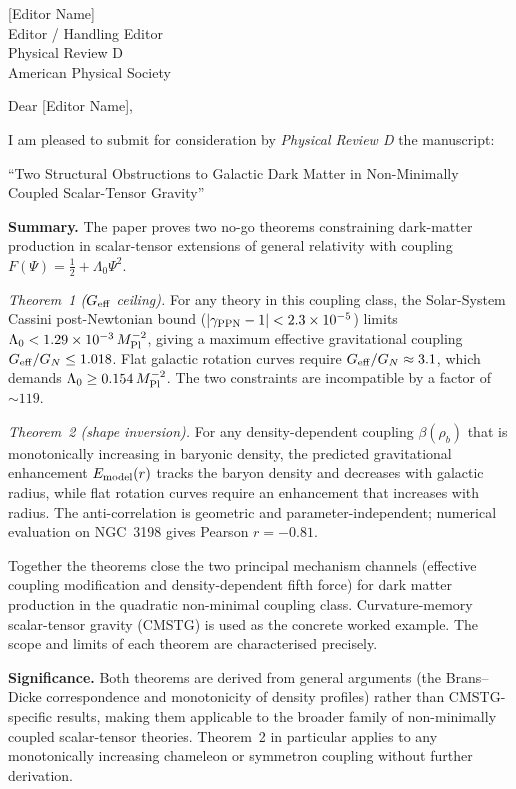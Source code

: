 \documentclass[12pt,a4paper]{letter}
\begin{document}
\begin{letter}{[Editor Name]\\
               Editor / Handling Editor\\
               Physical Review D\\
               American Physical Society}

\opening{Dear [Editor Name],}

I am pleased to submit for consideration by \textit{Physical Review D} the
manuscript:

\begin{center}
``Two Structural Obstructions to Galactic Dark Matter in Non-Minimally
Coupled Scalar-Tensor Gravity''
\end{center}

\textbf{Summary.}
The paper proves two no-go theorems constraining dark-matter production in
scalar-tensor extensions of general relativity with coupling $F(\Psi) =
\tfrac{1}{2} + \Lambda_0\Psi^2$.

\emph{Theorem~1 ($G_{\rm eff}$ ceiling).}
For any theory in this coupling class, the Solar-System Cassini
post-Newtonian bound ($|\gamma_{\rm PPN}-1| < 2.3\times10^{-5}$) limits
$\Lambda_0 < 1.29\times10^{-3}\,M_{\rm Pl}^{-2}$, giving a maximum
effective gravitational coupling $G_{\rm eff}/G_N \leq 1.018$.
Flat galactic rotation curves require $G_{\rm eff}/G_N \approx 3.1$, which
demands $\Lambda_0 \geq 0.154\,M_{\rm Pl}^{-2}$.  The two constraints are
incompatible by a factor of $\sim\!119$.

\emph{Theorem~2 (shape inversion).}
For any density-dependent coupling $\beta(\rho_b)$ that is monotonically
increasing in baryonic density, the predicted gravitational enhancement
$E_{\rm model}(r)$ tracks the baryon density and decreases with galactic
radius, while flat rotation curves require an enhancement that increases
with radius.  The anti-correlation is geometric and parameter-independent;
numerical evaluation on NGC~3198 gives Pearson $r = -0.81$.

Together the theorems close the two principal mechanism channels (effective
coupling modification and density-dependent fifth force) for dark matter
production in the quadratic non-minimal coupling class.  Curvature-memory
scalar-tensor gravity (CMSTG) is used as the concrete worked example.
The scope and limits of each theorem are characterised precisely.

\textbf{Significance.}
Both theorems are derived from general arguments (the Brans--Dicke
correspondence and monotonicity of density profiles) rather than
CMSTG-specific results, making them applicable to the broader family of
non-minimally coupled scalar-tensor theories.  Theorem~2 in particular
applies to any monotonically increasing chameleon or symmetron coupling
without further derivation.


\end{letter}
\end{document}

